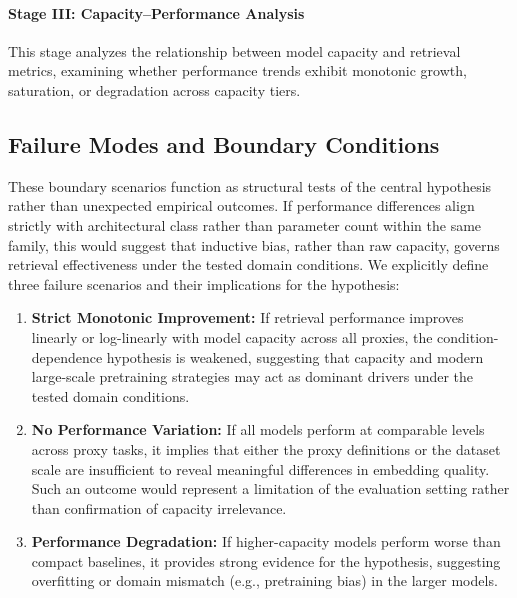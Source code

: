 \paragraph{Stage III: Capacity–Performance Analysis}
This stage analyzes the relationship between model capacity and retrieval metrics, examining whether performance trends exhibit monotonic growth, saturation, or degradation across capacity tiers.




\subsection{Failure Modes and Boundary Conditions}
These boundary scenarios function as structural tests of the central hypothesis rather than unexpected empirical outcomes.
If performance differences align strictly with architectural class rather than parameter count within the same family, this would suggest that inductive bias, rather than raw capacity, governs retrieval effectiveness under the tested domain conditions.
We explicitly define three failure scenarios and their implications for the hypothesis:

\begin{enumerate}
    \item \textbf{Strict Monotonic Improvement:} If retrieval performance improves linearly or log-linearly with model capacity across all proxies, the condition-dependence hypothesis is weakened, suggesting that capacity and modern large-scale pretraining strategies may act as dominant drivers under the tested domain conditions.
    \item \textbf{No Performance Variation:} If all models perform at comparable levels across proxy tasks, it implies that either the proxy definitions or the dataset scale are insufficient to reveal meaningful differences in embedding quality. Such an outcome would represent a limitation of the evaluation setting rather than confirmation of capacity irrelevance.
    \item \textbf{Performance Degradation:} If higher-capacity models perform worse than compact baselines, it provides strong evidence for the hypothesis, suggesting overfitting or domain mismatch (e.g., pretraining bias) in the larger models.
\end{enumerate}
